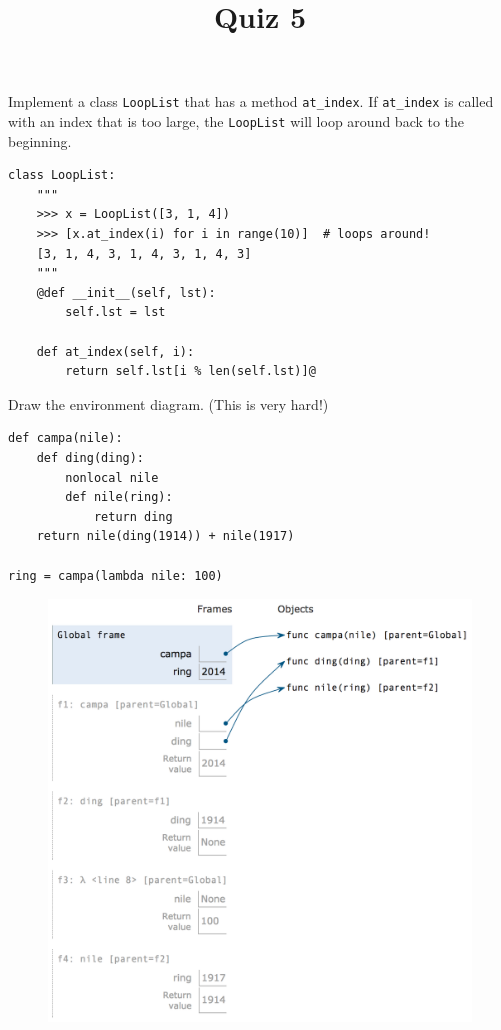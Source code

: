 \documentclass[twoside]{article}
\title{\sc Quiz 5 \solution{Solutions}}
\begin{document}
\maketitle

\begin{enumerate}

Implement a class \lstinline{LoopList} that has a method \lstinline{at_index}. If \lstinline{at_index} is called with an index that is too large, the \lstinline{LoopList} will loop around back to the beginning.
\vspace{0.1in}

\begin{lstlisting}
class LoopList:
    """
    >>> x = LoopList([3, 1, 4])
    >>> [x.at_index(i) for i in range(10)]  # loops around!
    [3, 1, 4, 3, 1, 4, 3, 1, 4, 3]
    """
    @def __init__(self, lst):
        self.lst = lst
    
    def at_index(self, i):
        return self.lst[i % len(self.lst)]@
\end{lstlisting}

\newpage


Draw the environment diagram. (This is very hard!)
\vspace{0.1in}

\begin{lstlisting}
def campa(nile):
    def ding(ding):
        nonlocal nile
        def nile(ring):
            return ding
    return nile(ding(1914)) + nile(1917)

ring = campa(lambda nile: 100)
\end{lstlisting}

\begin{figure}[ht!]
\hspace*{5mm}
\includegraphics[width=155mm]{../../../../images/quiz5_sol.png}
\end{figure}

\end{enumerate}
\end{document}
